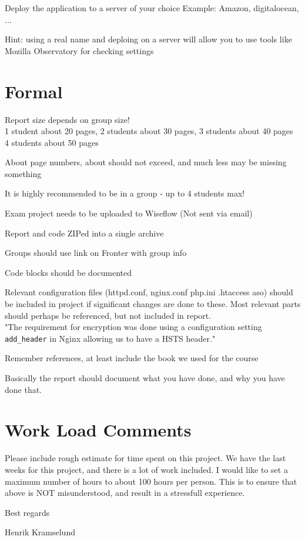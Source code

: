 \documentclass[a4paper,11pt,notitlepage]{report}
\begin{document}
Deploy the application to a server of your choice Example: Amazon, digitalocean, ...

Hint: using a real name and deploing on a server will allow you to use tools like Mozilla Observatory for checking settings 

\section*{Formal}
\begin{list2}
\item Report size depends on group size!\\
1 student about 20 pages, 2 students about 30 pages, 3 students about 40 pages\\ 4 students about 50 pages
\item About page numbers, about should not exceed, and much less may be missing something
\item  It is highly recommended to be in a group - up to 4 students max!
\item Exam project needs to be uploaded to Wiseflow (Not sent via email)
\item Report and code ZIPed into a single archive
\item Groups should use link on Fronter with group info
\item Code blocks should be documented
\item Relevant configuration files (httpd.conf, nginx.conf php.ini .htaccess aso) should be included in project if significant changes are done to these. Most relevant parts should perhaps be referenced, but not included in report.\\ "The requirement for encryption was done using a configuration setting \verb+add_header+ in Nginx allowing us to have a HSTS header."
\item Remember references, at least include the book we used for the course
\end{list2}

Basically the report should document what you have done, and why you have done that.

\section*{Work Load Comments}

Please include rough estimate for time spent on this project. We have the last weeks for this project, and there is a lot of work included. I would like to set a maximum number of hours to about 100 hours per person. This is to ensure that above is NOT misunderstood, and result in a stressfull experience.

Best regards

Henrik Kramselund
\end{document}
